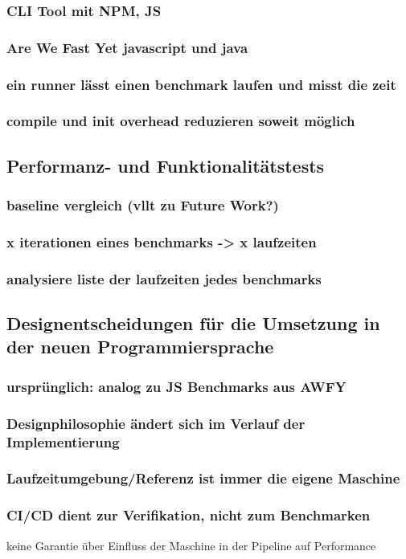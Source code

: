 \subsubsection{ CLI Tool mit NPM, JS }
\subsubsection{ Are We Fast Yet javascript und java }
\subsubsection{ ein runner lässt einen benchmark laufen und misst die zeit }
\subsubsection{ compile und init overhead reduzieren soweit möglich }
  
\subsection{ Performanz- und Funktionalitätstests }
\subsubsection{ baseline vergleich (vllt zu Future Work?) }
\subsubsection{ x iterationen eines benchmarks -> x laufzeiten  }
\subsubsection{ analysiere liste der laufzeiten jedes benchmarks }
    
\subsection{ Designentscheidungen für die Umsetzung in der neuen Programmiersprache }
\subsubsection{ ursprünglich: analog zu JS Benchmarks aus AWFY }
\subsubsection{ Designphilosophie ändert sich im Verlauf der Implementierung  }
\subsubsection{ Laufzeitumgebung/Referenz ist immer die eigene Maschine }
\subsubsection{CI/CD dient zur Verifikation, nicht zum Benchmarken  }
    {\rightarrow} keine Garantie über Einfluss der Maschine in der Pipeline auf Performance 
    